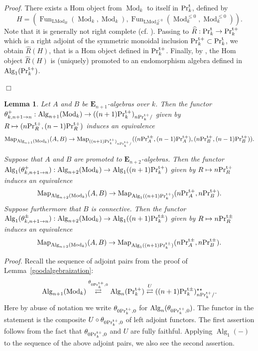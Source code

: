 \documentclass[leqno,12pt]{amsart}
\theoremstyle{plain}
\newtheorem{Lemma}[Theorem]{Lemma}
\theoremstyle{definition}
\newcommand{\PRT}{\textup{Pr}^{\textup{t}}}
\newcommand{\PRTT}{\textup{Pr}^{\textup{t}+}}
\newcommand{\PRTTT}{\textup{Pr}^{\textup{t}\pm}}
\newcommand{\Mod}{\operatorname{Mod}}
\newcommand{\Map}{\operatorname{Map}}
\newcommand{\Fun}{\operatorname{Fun}}
\newcommand{\Alg}{\operatorname{Alg}}
\newcommand{\LMod}{\operatorname{LMod}}
\newcommand{\Proof}{{\sl Proof.}\quad}
\newcommand{\QED}{{\unskip\nobreak\hfil\penalty50\quad\null\nobreak\hfil
{$\Box$}\parfillskip0pt\finalhyphendemerits0\par\medskip}}
\begin{document}
\Proof
There exists a Hom object from $\Mod_k$ to itself in $\PRT_k$, defined by
\[
H=(\Fun_{\LMod_B}(\Mod_k,\Mod_k), \Fun_{\LMod_B^{\le0}}(\Mod_k^{\le0},\Mod_k^{\le0})).
\]
Note that it is generally not right complete (cf. \cite{CKDA}).
Passing to $\widehat{R}:\PRT_k\to \PRTT_k$ which is a right adjoint of the symmetric monoidal inclusion $\PRTT_k\subset \PRT_k$,
we obtain $\widehat{R}(H)$, that is a Hom object defined in $\PRTT_k$.
Finally, by \cite[4.7.1.40, 4.7.1.41]{HA}, the Hom object $\widehat{R}(H)$ is
(uniquely) promoted to an endomorphism algebra defined in $\Alg_1(\PRTT_k)$.
\QED



\begin{Lemma}
\label{compff}
Let $A$ and $B$ be $\mathbf{E}_{n+1}$-algebras over $k$. 
Then the functor $\theta_{k,n+1\to n}^+:\Alg_{n+1}(\Mod_k)\to ((n+1)\PRTT_k)_{n\PRTT_k/}$ given by $R\mapsto (n\PRTT_R,(n-1)\PRTT_R)$ induces an equivalence
\[
\Map_{\Alg_{n+1}(\Mod_k)}(A,B)\to \Map_{((n+1)\PRTT_k)_{n\PRTT_k/}}((n\PRTTT_A,(n-1)\PRTT_A),(n\PRTT_B,(n-1)\PRTT_B)).
\]


Suppose that $A$ and $B$ are promoted to $\mathbf{E}_{n+2}$-algebras. 
Then the functor $\Alg_1(\theta_{k,n+1\to n}^+):\Alg_{n+2}(\Mod_k)\to\Alg_1((n+1)\PRTT_k)$ given by $R\mapsto n\PRTT_R$ induces an equivalence
\[
\Map_{\Alg_{n+2}(\Mod_k)}(A,B)\to \Map_{\Alg_1((n+1)\PRTT_k)}(n\PRTT_A,n\PRTT_B).
\]
Suppose furthermore that $B$ is connective.
Then 
the functor $\Alg_1(\theta_{k,n+1\to n}^\pm):\Alg_{n+2}(\Mod_k)\to\Alg_1((n+1)\PRTTT_k)$ given by $R\mapsto n\PRTTT_R$ induces an equivalence
\[
\Map_{\Alg_{n+2}(\Mod_k)}(A,B)\to \Map_{\Alg_1((n+1)\PRTTT_k)}(n\PRTTT_A,n\PRTTT_B).
\]


\end{Lemma}


\Proof
Recall the sequence of adjoint pairs from the proof of Lemma~\ref{goodalgebraization}:
\[
\Alg_{n+1}(\Mod_k)\stackrel{\theta_{0\PRTT_k,0}}{\rightleftarrows}   \Alg_{n}(\PRTT_k) \stackrel{U}{\rightleftarrows} ((n+1)\PRTTT_k)_{n\PRTT_k/}^{\star \star}.
\]
Here by abuse of notation we write $\theta_{0\PRTT_k,0}$  for $\Alg_n(\theta_{0\PRTT_k,0})$.
The functor in the statement is the composite $U\circ  \theta_{0\PRTT_k,0}$ of left adjoint functors.
The first assertion follows from the fact that $\theta_{0\PRTT_k,0}$ and $U$ are fully faithful.
Applying $\Alg_1(-)$ to the sequence of the above adjoint pairs,
we also see the second assertion.
\end{document}
